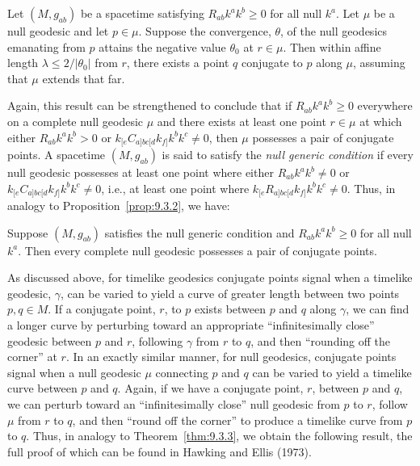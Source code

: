 \begin{proposition}\label{prop:9.3.6}
Let \((M,g_{ab})\) be a spacetime satisfying \(R_{ab}k^ak^b\geq0\) for all null
\(k^a\). Let \(\mu\) be a null geodesic and let \(p\in\mu\). Suppose the
convergence, \(\theta\), of the null geodesics emanating from \(p\) attains the
negative value \(\theta_0\) at \(r\in\mu\). Then within affine length
\(\lambda\leq2/\lvert\theta_0\rvert\) from \(r\), there exists a point \(q\)
conjugate to \(p\) along \(\mu\), assuming that \(\mu\) extends that far.
\end{proposition}

Again, this result can be strengthened to conclude that if \(R_{ab}k^ak^b\geq0\)
everywhere on a complete null geodesic \(\mu\) and there exists at least one point
\(r\in\mu\) at which either \(R_{ab}k^ak^b>0\) or
\(k_{[e}C_{a]bc[d}k_{f]}k^bk^c\ne0\), then \(\mu\) possesses a pair of conjugate
points. A spacetime \((M,g_{ab})\) is said to satisfy the \emph{null generic condition}
if every null geodesic possesses at least one point where either \(R_{ab}k^ak^b\ne0\)
or \(k_{[e}C_{a]bc[d}k_{f]}k^bk^c\ne0\), i.e., at least one point where
\(k_{[e}R_{a]bc[d}k_{f]}k^bk^c\ne0\). Thus, in analogy to
Proposition~\ref{prop:9.3.2}, we have:

\begin{proposition}\label{prop:9.3.7}
Suppose \((M,g_{ab})\) satisfies the null generic condition and
\(R_{ab}k^ak^b\geq0\) for all null \(k^a\). Then every complete null geodesic
possesses a pair of conjugate points.
\end{proposition}

As discussed above, for timelike geodesics conjugate points signal when a timelike
geodesic, \(\gamma\), can be varied to yield a curve of greater length between two points
\(p,q\in M\). If a conjugate point, \(r\), to \(p\) exists between \(p\) and \(q\) along
\(\gamma\), we can find a longer curve by perturbing toward an appropriate
``infinitesimally close'' geodesic between \(p\) and \(r\), following \(\gamma\) from
\(r\) to \(q\), and then ``rounding off the corner'' at \(r\). In an exactly similar
manner, for null geodesics, conjugate points signal when a null geodesic \(\mu\)
connecting \(p\) and \(q\) can be varied to yield a timelike curve between \(p\) and
\(q\). Again, if we have a conjugate point, \(r\), between \(p\) and \(q\), we can
perturb toward an ``infinitesimally close'' null geodesic from \(p\) to \(r\), follow
\(\mu\) from \(r\) to \(q\), and then ``round off the corner'' to produce a timelike
curve from \(p\) to \(q\). Thus, in analogy to Theorem~\ref{thm:9.3.3}, we obtain the
following result, the full proof of which can be found in Hawking and Ellis (1973).

